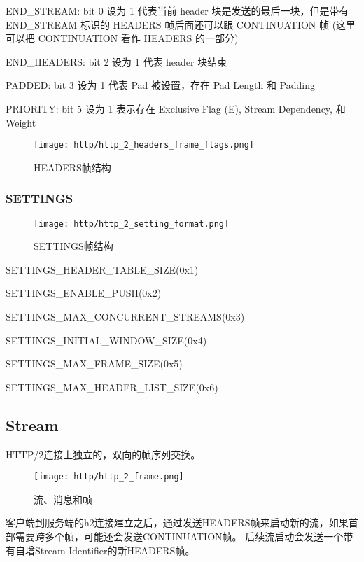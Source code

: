 END\_STREAM: bit 0 设为 1 代表当前 header 块是发送的最后一块，但是带有 END\_STREAM 标识的 HEADERS 帧后面还可以跟 CONTINUATION 帧 (这里可以把 CONTINUATION 看作 HEADERS 的一部分)

END\_HEADERS: bit 2 设为 1 代表 header 块结束

PADDED: bit 3 设为 1 代表 Pad 被设置，存在 Pad Length 和 Padding

PRIORITY: bit 5 设为 1 表示存在 Exclusive Flag (E), Stream Dependency, 和 Weight


\begin{figure}[H]
    \centering
    \texttt{[image: http/http\_2\_headers\_frame\_flags.png]}
    \caption{HEADERS帧结构}
\end{figure}



\subsubsection{SETTINGS}

\begin{figure}[H]
    \centering
    \texttt{[image: http/http\_2\_setting\_format.png]}
    \caption{SETTINGS帧结构}
\end{figure}

SETTINGS\_HEADER\_TABLE\_SIZE(0x1)

SETTINGS\_ENABLE\_PUSH(0x2)

SETTINGS\_MAX\_CONCURRENT\_STREAMS(0x3)

SETTINGS\_INITIAL\_WINDOW\_SIZE(0x4)

SETTINGS\_MAX\_FRAME\_SIZE(0x5)

SETTINGS\_MAX\_HEADER\_LIST\_SIZE(0x6)


\subsection{Stream}

HTTP/2连接上独立的，双向的帧序列交换。

\begin{figure}[H]
    \centering
    \texttt{[image: http/http\_2\_frame.png]}
    \caption{流、消息和帧}
\end{figure}

客户端到服务端的h2连接建立之后，通过发送HEADERS帧来启动新的流，如果首部需要跨多个帧，可能还会发送CONTINUATION帧。
后续流启动会发送一个带有自增Stream Identifier的新HEADERS帧。



